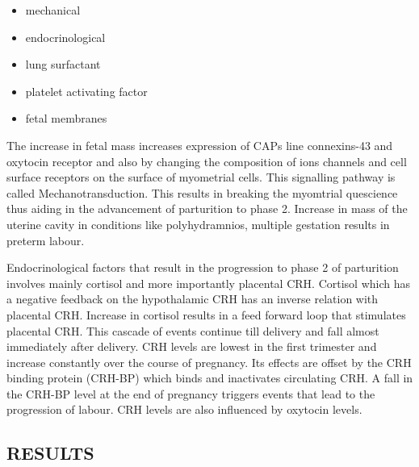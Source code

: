 \documentclass[14pt]{extarticle}
\begin{document}
\begin{itemize}
    \item mechanical
    \item endocrinological
    \item lung surfactant
    \item platelet activating factor
    \item fetal membranes
\end{itemize}

The increase in fetal mass increases expression of CAPs line connexins-43 and oxytocin receptor and also by changing the composition of ions channels and cell surface receptors on the surface of myometrial cells. This signalling pathway is called Mechanotransduction. This results in breaking the myomtrial quescience thus aiding in the advancement of parturition to phase 2. Increase in mass of the uterine cavity in conditions like  polyhydramnios, multiple gestation results in preterm labour. 

Endocrinological factors that result in the progression to phase 2 of parturition involves mainly cortisol and more importantly placental CRH. Cortisol which has a negative feedback on the hypothalamic CRH has an inverse relation with placental CRH. Increase in cortisol results in a feed forward loop that stimulates placental CRH. This cascade of events continue till delivery and fall almost immediately after delivery. CRH levels are lowest in the first trimester and increase constantly over the course of pregnancy. Its effects are offset by the CRH binding protein (CRH-BP) which binds and inactivates circulating CRH. A fall in the CRH-BP level at the end of pregnancy triggers events that lead to the progression of labour. CRH levels are also influenced by oxytocin levels.




\newpage
\null
\vfill
\begin{flushright}
    \section{RESULTS}
\end{flushright}
\hrulefill
\newpage
\end{document}
